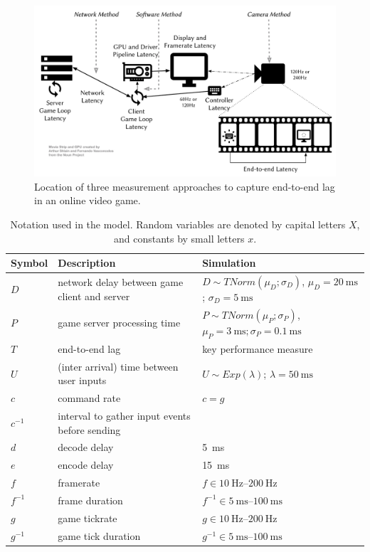 \begin{figure}[!t]
    \centering
    \includegraphics[width=1.0\columnwidth]{../../../models/e2e-lag.pdf}
    \caption{Location of three measurement approaches to capture end-to-end lag in an online video game.}
\label{fig:measurement-methods}
\end{figure}



\begin{table}[!t]
\caption{Notation used in the model. Random variables are denoted by capital letters $X$, and constants by small letters $x$.}
\label{tab:notation}
	\centering
	\begin{tabu}{lX[1,l]X[1,l]}
	\toprule
	\textbf{Symbol} & \textbf{Description} & \textbf{Simulation} \\
	\midrule
	$D$ & network delay between game client and server & $D \sim TNorm(\mu_D;\sigma_D)$, $\mu_D = \SI{20}{\milli\second}$; $\sigma_D = \SI{5}{\milli\second}$\\
	$P$ & game server processing time & $P \sim TNorm(\mu_P;\sigma_P)$, $ \mu_P = \SI{3}{\milli\second}; \sigma_P = \SI{0.1}{\milli\second}$\\
	$T$ & end-to-end lag & key performance measure \\
	$U$ & (inter arrival) time between user inputs & $U \sim Exp(\lambda)$; $\lambda = \SI{50}{\milli\second}$\\
	\midrule
	$c$ & command rate & $c=g$ \\
	$c^{-1}$ & interval to gather input events before sending & \\
	$d$ & decode delay & \SI{5}{\milli\second} \\
	$e$ & encode delay & \SI{15}{\milli\second} \\
	$f$ & framerate & $f \in \SIrange{10}{200}{\hertz}$ \\
	$f^{-1}$ & frame duration & $f^{-1} \in \SIrange{5}{100}{\milli\second}$ \\
	$g$ & game tickrate & $g \in \SIrange{10}{200}{\hertz}$ \\
	$g^{-1}$ & game tick duration & $g^{-1} \in \SIrange{5}{100}{\milli\second}$ \\
	\bottomrule
	\end{tabu}
\end{table}



